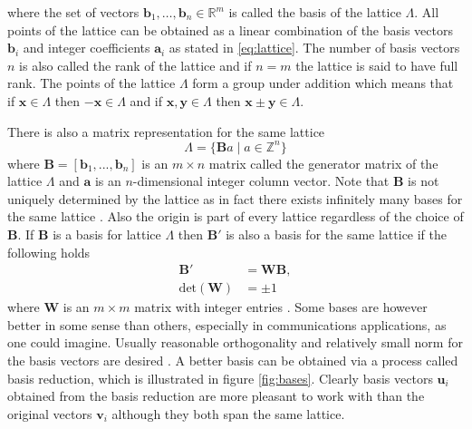 \documentclass[english,12pt,a4paper,pdftex,sci,utf8]{aaltothesis}
\begin{document}
\noindent where the set of vectors $\mathbf{b}_1, \ldots, \mathbf{b}_n \in \mathbb{R}^m$ is called the basis of the lattice $\Lambda$. All points of the lattice can be obtained as a linear combination of the basis vectors $\mathbf{b}_i$ and integer coefficients $\mathbf{a}_i$ as stated in \eqref{eq:lattice}. The number of basis vectors $n$ is also called the rank of the lattice and if $n = m$ the lattice is said to have full rank. The points of the lattice $\Lambda$ form a group under addition which means that if $\mathbf{x} \in \Lambda$ then $-\mathbf{x} \in \Lambda$ and if $\mathbf{x}, \mathbf{y} \in \Lambda$ then $\mathbf{x} \pm \mathbf{y} \in \Lambda$. \cite{cassels}
\par There is also a matrix representation for the same lattice
\begin{equation}
\Lambda = \{\mathbf{B}a \mid a \in {\mathbb Z}^n\} \label{eq:matrix}
\end{equation}
where $\mathbf{B} = [\mathbf{b}_1, ... , \mathbf{b}_n]$ is an $m \times n$ matrix called the generator matrix of the lattice $\Lambda$ and $\mathbf{a}$ is an $n$-dimensional integer column vector. Note that $\mathbf{B}$ is not uniquely determined by the lattice as in fact there exists infinitely many bases for the same lattice \cite{cassels}. Also the origin is part of every lattice regardless of the choice of $\mathbf{B}$. If $\mathbf{B}$ is a basis for lattice $\Lambda$ then $\mathbf{B}'$ is also a basis for the same lattice if the following holds
\begin{align}
\mathbf{B}' &= \mathbf{W}\mathbf{B}, \\
\text{det}(\mathbf{W}) &= \pm 1
\label{eq:basis_change}
\end{align}
where $\mathbf{W}$ is an $m \times m$ matrix with integer entries \cite{agrell}. Some bases are however better in some sense than others, especially in communications applications, as one could imagine. Usually reasonable orthogonality and relatively small norm for the basis vectors are desired \cite{agrell}. A better basis can be obtained via a process called basis reduction, which is illustrated in figure \ref{fig:bases}. Clearly basis vectors $\mathbf{u}_i$ obtained from the basis reduction are more pleasant to work with than the original vectors $\mathbf{v}_i$ although they both span the same lattice.
\end{document}
